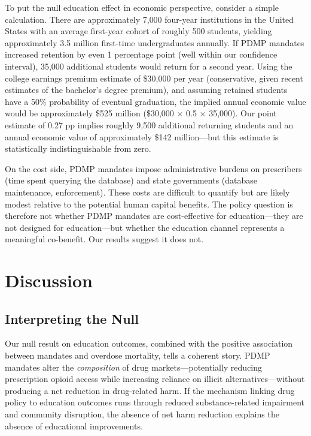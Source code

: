 \documentclass[12pt]{article}
\begin{document}
To put the null education effect in economic perspective, consider a simple calculation. There are approximately 7,000 four-year institutions in the United States with an average first-year cohort of roughly 500 students, yielding approximately 3.5 million first-time undergraduates annually. If PDMP mandates increased retention by even 1 percentage point (well within our confidence interval), 35,000 additional students would return for a second year. Using the college earnings premium estimate of \$30,000 per year (conservative, given recent estimates of the bachelor's degree premium), and assuming retained students have a 50\% probability of eventual graduation, the implied annual economic value would be approximately \$525 million (\$30,000 $\times$ 0.5 $\times$ 35,000). Our point estimate of 0.27 pp implies roughly 9,500 additional returning students and an annual economic value of approximately \$142 million---but this estimate is statistically indistinguishable from zero.

On the cost side, PDMP mandates impose administrative burdens on prescribers (time spent querying the database) and state governments (database maintenance, enforcement). These costs are difficult to quantify but are likely modest relative to the potential human capital benefits. The policy question is therefore not whether PDMP mandates are cost-effective for education---they are not designed for education---but whether the education channel represents a meaningful co-benefit. Our results suggest it does not.

\section{Discussion}

\subsection{Interpreting the Null}

Our null result on education outcomes, combined with the positive association between mandates and overdose mortality, tells a coherent story. PDMP mandates alter the \textit{composition} of drug markets---potentially reducing prescription opioid access while increasing reliance on illicit alternatives---without producing a net reduction in drug-related harm. If the mechanism linking drug policy to education outcomes runs through reduced substance-related impairment and community disruption, the absence of net harm reduction explains the absence of educational improvements.
\end{document}

